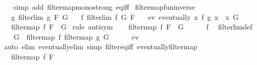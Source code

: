 \begin{isabellebody}
%
\isadelimproof
\ \ %
\endisadelimproof
%
\isatagproof
{}\isamarkupfalse%
\ {\isacharparenleft}{\kern0pt}simp\ add{\isacharcolon}{\kern0pt}\ filtermap{\isacharunderscore}{\kern0pt}mono{\isacharunderscore}{\kern0pt}strong\ eq{\isacharunderscore}{\kern0pt}iff{\isacharparenright}{\kern0pt}%
\endisatagproof
{\isafoldproof}%
%
\isadelimproof
\isanewline
%
\endisadelimproof
\isanewline
{}\isamarkupfalse%
\ filtermap{\isacharunderscore}{\kern0pt}fun{\isacharunderscore}{\kern0pt}inverse{\isacharcolon}{\kern0pt}\isanewline
\ \ \ g{\isacharcolon}{\kern0pt}\ {\isachardoublequoteopen}filterlim\ g\ F\ G{\isachardoublequoteclose}\isanewline
\ \ \ f{\isacharcolon}{\kern0pt}\ {\isachardoublequoteopen}filterlim\ f\ G\ F{\isachardoublequoteclose}\isanewline
\ \ \ ev{\isacharcolon}{\kern0pt}\ {\isachardoublequoteopen}eventually\ {\isacharparenleft}{\kern0pt}{\isasymlambda}x{\isachardot}{\kern0pt}\ f\ {\isacharparenleft}{\kern0pt}g\ x{\isacharparenright}{\kern0pt}\ {\isacharequal}{\kern0pt}\ x{\isacharparenright}{\kern0pt}\ G{\isachardoublequoteclose}\isanewline
\ \ \ {\isachardoublequoteopen}filtermap\ f\ F\ {\isacharequal}{\kern0pt}\ G{\isachardoublequoteclose}\isanewline
%
\isadelimproof
%
\endisadelimproof
%
\isatagproof
{}\isamarkupfalse%
\ {\isacharparenleft}{\kern0pt}rule\ antisym{\isacharparenright}{\kern0pt}\isanewline
\ \ \isamarkupfalse%
\ {\isachardoublequoteopen}filtermap\ f\ F\ {\isasymle}\ G{\isachardoublequoteclose}\isanewline
\ \ \ \ \isamarkupfalse%
\ f\ \isamarkupfalse%
\ filterlim{\isacharunderscore}{\kern0pt}def\ \isacommand{{\isachardot}{\kern0pt}}\isamarkupfalse%
\isanewline
\ \ \isamarkupfalse%
\ {\isachardoublequoteopen}G\ {\isacharequal}{\kern0pt}\ filtermap\ f\ {\isacharparenleft}{\kern0pt}filtermap\ g\ G{\isacharparenright}{\kern0pt}{\isachardoublequoteclose}\isanewline
\ \ \ \ \isamarkupfalse%
\ ev\ \isamarkupfalse%
\ {\isacharparenleft}{\kern0pt}auto\ elim{\isacharcolon}{\kern0pt}\ eventually{\isacharunderscore}{\kern0pt}elim{}\ simp{\isacharcolon}{\kern0pt}\ filter{\isacharunderscore}{\kern0pt}eq{\isacharunderscore}{\kern0pt}iff\ eventually{\isacharunderscore}{\kern0pt}filtermap{\isacharparenright}{\kern0pt}\isanewline
\ \ \isamarkupfalse%
\ \isamarkupfalse%
\ {\isachardoublequoteopen}{\isasymdots}\ {\isasymle}\ filtermap\ f\ F{\isachardoublequoteclose}\isanewline
\ \ \ \ \isamarkupfalse%

\end{isabellebody}
